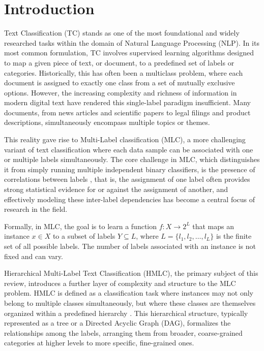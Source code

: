 \chapter{Introduction}

Text Classification (TC) stands as one of the most foundational and widely researched tasks within the domain of Natural Language Processing (NLP). \cite{Zangari2024}  In its most common formulation, TC involves supervised learning algorithms designed to map a given piece of text, or document, to a predefined set of labels or categories. \cite{Zangari2024} Historically, this has often been a multiclass problem, where each document is assigned to exactly one class from a set of mutually exclusive options. However, the increasing complexity and richness of information in modern digital text have rendered this single-label paradigm insufficient.\cite{Hu2025}  Many documents, from news articles and scientific papers to legal filings and product descriptions, simultaneously encompass multiple topics or themes. \cite{TidakeSane2018}

This reality gave rise to Multi-Label classification (MLC), a more challenging variant of text classification where each data sample can be associated with one or multiple labels simultaneously.\cite{TidakeSane2018} The core challenge in MLC, which distinguishes it from simply running multiple independent binary classifiers, is the presence of correlations between labels \cite{TidakeSane2018}, that is, the assignment of one label often provides strong statistical evidence for or against the assignment of another, and effectively modeling these inter-label dependencies has become a central focus of research in the field. \cite{Huang2024, TidakeSane2018}

Formally, in MLC, the goal is to learn a function $f: X \rightarrow 2^L$ that maps an instance $x \in X$ to a subset of labels $Y \subseteq L$, where $L = \{l_1, l_2, \ldots, l_L\}$ is the finite set of all possible labels. The number of labels associated with an instance is not fixed and can vary. \cite{TidakeSane2018}

Hierarchical Multi-Label Text Classification (HMLC), the primary subject of this review, introduces a further layer of complexity and structure to the MLC problem. HMLC is defined as a classification task where instances may not only belong to multiple classes simultaneously, but where these classes are themselves organized within a predefined hierarchy \cite{liu2023recentadvanceshierarchicalmultilabel}. This hierarchical structure, typically represented as a tree or a Directed Acyclic Graph (DAG), formalizes the relationships among the labels, arranging them from broader, coarse-grained categories at higher levels to more specific, fine-grained ones. \cite{liu2023recentadvanceshierarchicalmultilabel}

